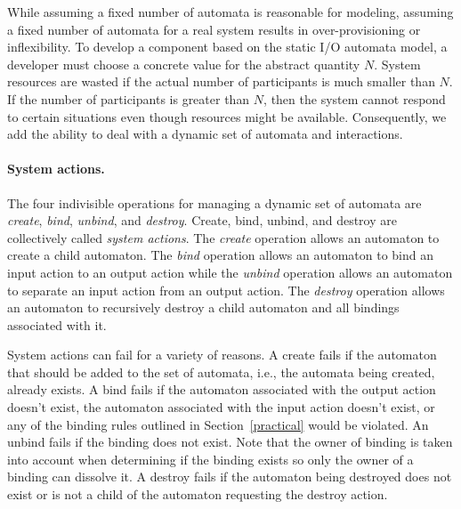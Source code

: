 While assuming a fixed number of automata is reasonable for modeling, assuming a fixed number of automata for a real system results in over-provisioning or inflexibility.
To develop a component based on the static I/O automata model, a developer must choose a concrete value for the abstract quantity $N$.
System resources are wasted if the actual number of participants is much smaller than $N$.
If the number of participants is greater than $N$, then the system cannot respond to certain situations even though resources might be available.
Consequently, we add the ability to deal with a dynamic set of automata and interactions.

\paragraph{System actions.}
The four indivisible operations for managing a dynamic set of automata are \emph{create}, \emph{bind}, \emph{unbind}, and \emph{destroy}.
Create, bind, unbind, and destroy are collectively called \emph{system actions}.
The \emph{create} operation allows an automaton to create a child automaton.
The \emph{bind} operation allows an automaton to bind an input action to an output action while the \emph{unbind} operation allows an automaton to separate an input action from an output action.
The \emph{destroy} operation allows an automaton to recursively destroy a child automaton and all bindings associated with it.

System actions can fail for a variety of reasons.
A create fails if the automaton that should be added to the set of automata, i.e., the automata being created, already exists.
A bind fails if the automaton associated with the output action doesn't exist, the automaton associated with the input action doesn't exist, or any of the binding rules outlined in Section~\ref{practical} would be violated.
An unbind fails if the binding does not exist.
Note that the owner of binding is taken into account when determining if the binding exists so only the owner of a binding can dissolve it.
A destroy fails if the automaton being destroyed does not exist or is not a child of the automaton requesting the destroy action.

